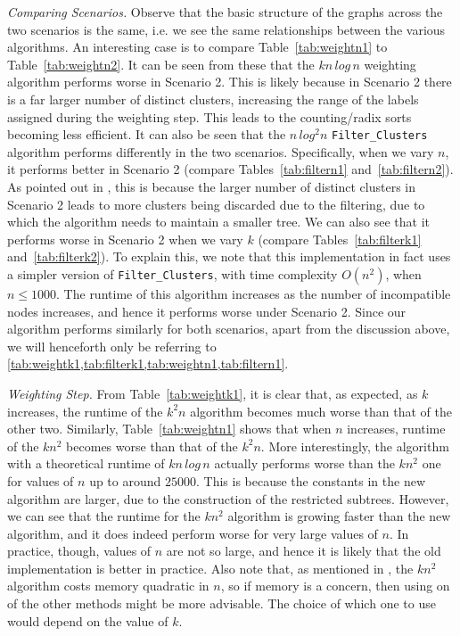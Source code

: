 \documentclass{article}
\begin{document}
    \textit{Comparing Scenarios.} Observe that the basic structure of the graphs across the two scenarios is the same, i.e. we see the same relationships between the various algorithms. An interesting case is to compare Table~\ref{tab:weightn1} to Table~\ref{tab:weightn2}. It can be seen from these that the $kn\,log\,n$ weighting algorithm performs worse in Scenario 2. This is likely because in Scenario 2 there is a far larger number of distinct clusters, increasing the range of the labels assigned during the weighting step. This leads to the counting/radix sorts becoming less efficient. It can also be seen that the $n\,log^2n$ \texttt{Filter\_Clusters} algorithm performs differently in the two scenarios. Specifically, when we vary $n$, it performs better in Scenario 2 (compare Tables~\ref{tab:filtern1} and~\ref{tab:filtern2}). As pointed out in \cite{jansson2018algorithms}, this is because the larger number of distinct clusters in Scenario 2 leads to more clusters being discarded due to the filtering, due to which the algorithm needs to maintain a smaller tree. We can also see that it performs worse in Scenario 2 when we vary $k$ (compare Tables~\ref{tab:filterk1} and~\ref{tab:filterk2}). To explain this, we note that this implementation in fact uses a simpler version of \texttt{Filter\_Clusters}, with time complexity $O(n^2)$, when $n \leq 1000$. The runtime of this algorithm increases as the number of incompatible nodes increases, and hence it performs worse under Scenario 2. Since our algorithm performs similarly for both scenarios, apart from the discussion above, we will henceforth only be referring to \cref{tab:weightk1,tab:filterk1,tab:weightn1,tab:filtern1}.

    \textit{Weighting Step.} From Table~\ref{tab:weightk1}, it is clear that, as expected, as $k$ increases, the runtime of the $k^2n$ algorithm becomes much worse than that of the other two. Similarly, Table~\ref{tab:weightn1} shows that when $n$ increases, runtime of the $kn^2$ becomes worse than that of the $k^2n$. More interestingly, the algorithm with a theoretical runtime of $kn\,log\,n$ actually performs worse than the $kn^2$ one for values of $n$ up to around $25000$. This is because the constants in the new algorithm are larger, due to the construction of the restricted subtrees. However, we can see that the runtime for the $kn^2$ algorithm is growing faster than the new algorithm, and it does indeed perform worse for very large values of $n$. In practice, though, values of $n$ are not so large, and hence it is likely that the old implementation is better in practice. Also note that, as mentioned in \cite{jansson2018algorithms}, the $kn^2$ algorithm costs memory quadratic in $n$, so if memory is a concern, then using on of the other methods might be more advisable. The choice of which one to use would depend on the value of $k$.
\end{document}
